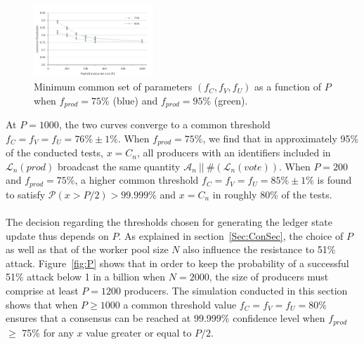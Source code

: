 \begin{figure}
 \vspace{-1.5cm}
 \begin{center}
   \includegraphics[width=0.4\textwidth]{Figures/tree_summary_p200t1000.png}
 \end{center}
 \vspace{-0.6cm}
  \caption{Minimum common set of parameters $(f_C, f_V, f_U)$ as a function of $P$ when $f_{prod} = 75\%$ (blue) and $f_{prod} = 95\%$ (green).}
   \label{fig:treeSum}
\end{figure}

At $P=1000$, the two curves converge to a common threshold $f_C=f_V=f_U=76\% \pm 1\%$. When $f_{prod} = 75\%$, we find that in approximately 95\% of the conducted tests, $x=C_n$, all producers with an identifiers included in $\mathcal{L}_{n}(prod)$ broadcast the same quantity $\mathcal{A}_n~||~\#(\mathcal{L}_{n}(vote))$. When $P=200$ and $f_{prod} = 75\%$, a higher common threshold $f_C = f_V = f_U = 85\% \pm 1\%$ is found to satisfy $\mathcal{P}(x>P/2) > 99.999\%$ and $x=C_n$ in roughly 80\% of the tests.\\
\\
The decision regarding the thresholds chosen for generating the ledger state update thus depends on $P$. As explained in section~\ref{Sec:ConSec}, the choice of $P$ as well as that of the worker pool size $N$ also influence the resistance to 51\% attack. Figure~\ref{fig:P} shows that in order to keep the probability of a successful 51\% attack below 1 in a billion when $N=2000$, the size of producers must comprise at least $P=1200$ producers. The simulation conducted in this section shows that when $P \geq 1000$ a common threshold value $f_C = f_V = f_U = 80\%$ ensures that a consensus can be reached at 99.999\% confidence level when $f_{prod}$ $\geq$ 75\% for any $x$ value greater or equal to $P/2$.


